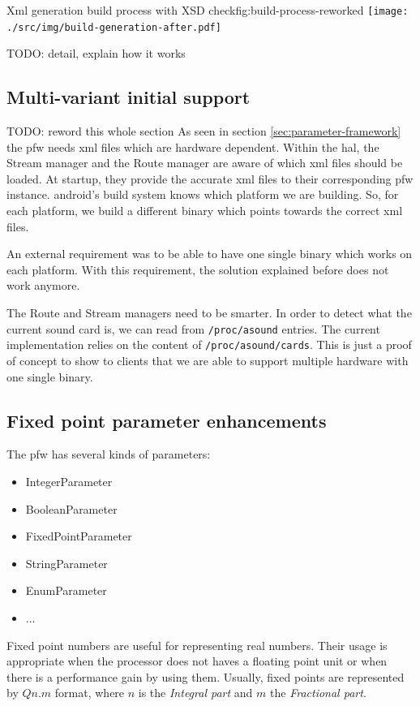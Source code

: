 \begin{figureGraphics}{Xml generation build process with XSD check}{fig:build-process-reworked}
    \texttt{[image: ./src/img/build-generation-after.pdf]}
\end{figureGraphics}

TODO: detail, explain how it works


\subsection{Multi-variant initial support}
TODO: reword this whole section
As seen in section \ref{sec:parameter-framework} the \gls{pfw} needs
\gls{xml} files which are hardware dependent.
Within the \gls{hal}, the Stream manager and the Route manager are aware of
which \gls{xml} files should be loaded. At startup, they provide the
accurate \gls{xml} files to their corresponding \gls{pfw} instance.
\gls{android}'s build system knows which platform we are building.
So, for each platform, we build a different binary which points towards the correct \gls{xml} files.

An external requirement was to be able to have one single binary which works on each platform. With this
requirement, the solution explained before does not work anymore.

The Route and Stream managers need to be smarter. In
order to detect what the current sound card is, we can read from \lstinline{/proc/asound} entries.
The current implementation relies on the content of \lstinline{/proc/asound/cards}.
This is just a proof of concept to show to clients that we are able to support multiple hardware
with one single binary.


\subsection{Fixed point parameter enhancements}
The \gls{pfw} has several kinds of parameters:
\begin{itemize}
    \item IntegerParameter
    \item BooleanParameter
    \item FixedPointParameter
    \item StringParameter
    \item EnumParameter
    \item ...
\end{itemize}

Fixed point numbers are useful for representing real numbers. Their
usage is appropriate when the processor does not haves a floating point unit
or when there is a performance gain by using them. Usually, fixed points are
represented by $Qn.m$ format, where $n$ is the \emph{Integral part} and $m$ the
\emph{Fractional part}.

